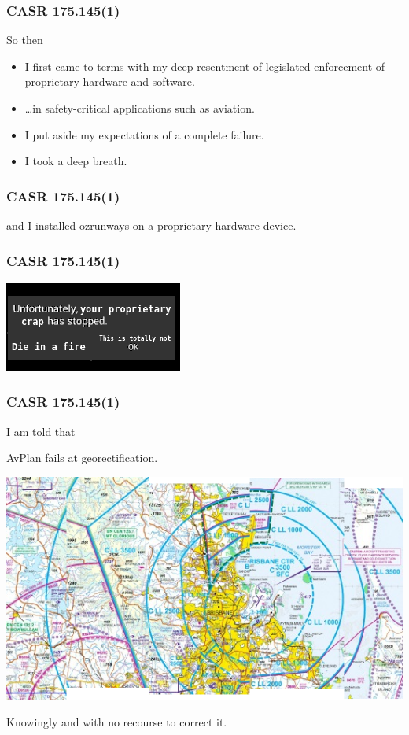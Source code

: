 \begin{frame}
\frametitle{CASR 175.145(1)}
\begin{block}{So then}
\begin{itemize}
\item<1-> I first came to terms with my deep resentment of legislated enforcement of proprietary hardware and software.
\item<2-> \ldots in safety-critical applications such as aviation.
\item<3-> I put aside my expectations of a complete failure.
\item<4-> I took a deep breath.
\end{itemize}
\end{block}
\end{frame}

\begin{frame}
\frametitle{CASR 175.145(1)}
\large
\begin{center}
and I installed ozrunways on a proprietary hardware device.
\end{center}
\end{frame}

\begin{frame}
\frametitle{CASR 175.145(1)}
\begin{center}
\includegraphics[height=0.2\textheight]{image/unfortunately-stopped.png}
\end{center}
\end{frame}

\begin{frame}
\frametitle{CASR 175.145(1)}
\begin{center}
\tiny{I am told that}
\par
\large
AvPlan fails at georectification.
\par
\includegraphics[height=0.5\textheight]{image/vtc-georectification.png}
\par
Knowingly and with no recourse to correct it.
\end{center}
\end{frame}

